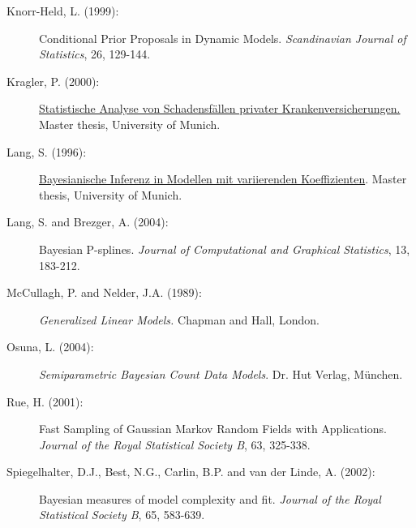 \begin{description}
\item[Knorr-Held, L. (1999):]
Conditional Prior Proposals in Dynamic Models. {\em Scandinavian
Journal of Statistics}, 26, 129-144.

\item[Kragler, P. (2000):] \href{http://www.scor.fr/us/2_laureat.asp?pays=2}
{Statistische Analyse von Schadensf\"allen privater
Krankenversicherungen.} Master thesis, University of Munich.


\item[Lang, S. (1996):]
\href{mailto:lang@stat.uni-muenchen.de} {Bayesianische Inferenz in
Modellen mit variierenden Koeffizienten}. Master thesis, University of Munich.


\item[Lang, S. and Brezger, A. (2004):]
Bayesian P-splines. {\em Journal of Computational and Graphical Statistics}, 13, 183-212.

\item[McCullagh, P. and Nelder, J.A. (1989):] {\em Generalized Linear Models.} Chapman and Hall, London.

\item[Osuna, L. (2004):] {\it Semiparametric Bayesian Count Data
Models}. Dr. Hut Verlag, M\"{u}nchen.

\item[Rue, H. (2001):] Fast Sampling of Gaussian Markov Random Fields with Applications.
{\em Journal of the Royal Statistical Society B}, 63, 325-338.

\item[Spiegelhalter, D.J., Best, N.G., Carlin, B.P. and van der Linde, A. (2002):]
Bayesian measures of model complexity and fit. {\em Journal of the
Royal Statistical Society B}, 65, 583-639.

\end{description}
